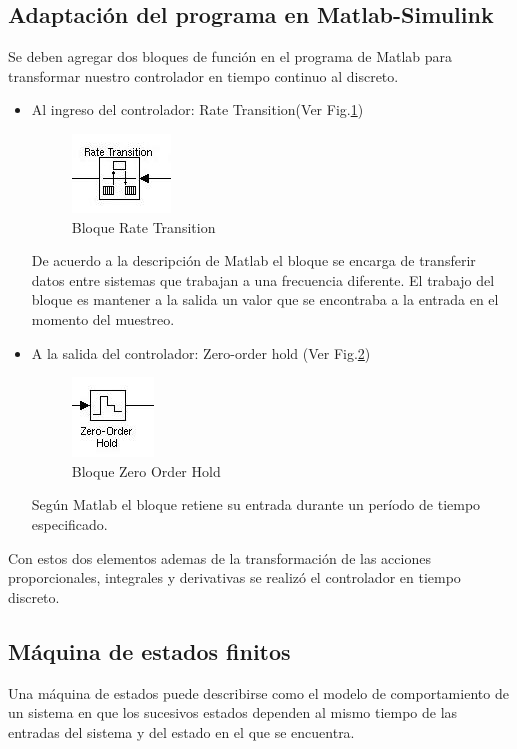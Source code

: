 \documentclass[journal]{IEEEtran}
\begin{document}
\subsection{Adaptación del programa en Matlab-Simulink}
Se deben agregar dos bloques de función en el programa de Matlab para transformar nuestro 
controlador en tiempo continuo al discreto.
\begin{itemize}
\item Al ingreso del controlador: Rate Transition(Ver Fig.\ref{fig:rate})
\begin{figure}[!t]
 \centering
  \includegraphics{rate.jpeg}
  \caption{Bloque Rate Transition}
  \label{fig:rate}
\end{figure}

De acuerdo a la descripción de Matlab el bloque se encarga de transferir datos 
entre sistemas que trabajan a una frecuencia diferente. El trabajo del bloque es mantener a 
la salida un valor que se encontraba a la entrada en el momento del muestreo.


\item A la salida del controlador: Zero-order hold (Ver Fig.\ref{fig:zero})
\begin{figure}[!t]
 \centering
  \includegraphics{zero_order.jpeg}
  \caption{Bloque Zero Order Hold }
  \label{fig:zero}
\end{figure}
Según Matlab el bloque retiene su entrada durante un período de tiempo especificado.
\end{itemize}

Con estos dos elementos ademas de la transformación de las acciones proporcionales, 
integrales y derivativas se realizó el controlador en tiempo discreto.


\subsection{Máquina de estados finitos}
\label{sec:MaqEstados}
Una máquina de estados puede describirse como el modelo de comportamiento de un sistema
en que los sucesivos estados dependen al mismo tiempo de las entradas del sistema y 
del estado en el que se encuentra. 
\end{document}
